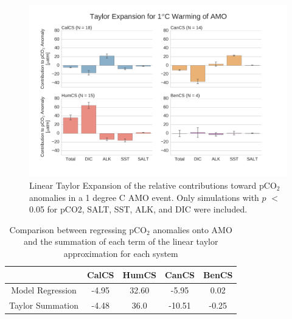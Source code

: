\documentclass[12pt]{article}
\begin{document}
\clearpage
\begin{figure}[!h]
	\centering
	\includegraphics[width=\linewidth]{../../figs/all-systems/taylor_expansions/taylor-expansion-AMO-pCO2-PVALUEREMOVED-smoothedClimate.png}
	\caption{Linear Taylor Expansion of the relative contributions toward pCO$_{2}$ anomalies in a 1 degree C AMO event. Only simulations with $p$ $<$ 0.05 for pCO2, SALT, SST, ALK, and DIC were included.}
	\label{fig:taylor-amo}
\end{figure}
\begin{table}[!h]
	\centering
	\begin{tabular}{c | c c c c }
		& CalCS & HumCS & CanCS & BenCS \\
		\midrule
		Model Regression & -4.95 & 32.60 & -5.95 & 0.02 \\
		Taylor Summation & -4.48 & 36.0 & -10.51 & -0.25 \\
	\end{tabular}
	\caption{Comparison between regressing pCO$_{2}$ anomalies onto AMO and the summation of each term of the linear taylor approximation for each system}
	\label{tab:taylor-amo}
\end{table}
\end{document}
